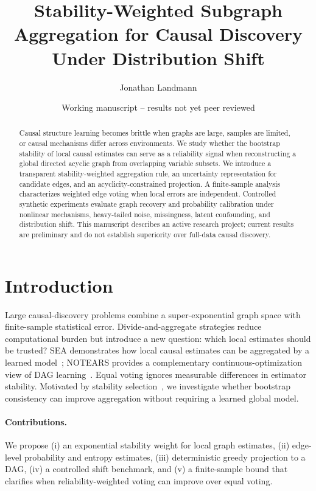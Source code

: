\documentclass[11pt]{article}
\title{Stability-Weighted Subgraph Aggregation for Causal Discovery Under Distribution Shift}
\author{Jonathan Landmann}
\date{Working manuscript -- results not yet peer reviewed}
\begin{document}
\maketitle

\begin{abstract}
Causal structure learning becomes brittle when graphs are large, samples are limited, or causal mechanisms differ across environments. We study whether the bootstrap stability of local causal estimates can serve as a reliability signal when reconstructing a global directed acyclic graph from overlapping variable subsets. We introduce a transparent stability-weighted aggregation rule, an uncertainty representation for candidate edges, and an acyclicity-constrained projection. A finite-sample analysis characterizes weighted edge voting when local errors are independent. Controlled synthetic experiments evaluate graph recovery and probability calibration under nonlinear mechanisms, heavy-tailed noise, missingness, latent confounding, and distribution shift. This manuscript describes an active research project; current results are preliminary and do not establish superiority over full-data causal discovery.
\end{abstract}

\section{Introduction}
Large causal-discovery problems combine a super-exponential graph space with finite-sample statistical error. Divide-and-aggregate strategies reduce computational burden but introduce a new question: which local estimates should be trusted? SEA demonstrates how local causal estimates can be aggregated by a learned model~\cite{wu2025sea}; NOTEARS provides a complementary continuous-optimization view of DAG learning~\cite{zheng2018notears}. Equal voting ignores measurable differences in estimator stability. Motivated by stability selection~\cite{meinshausen2010stability}, we investigate whether bootstrap consistency can improve aggregation without requiring a learned global model.

\paragraph{Contributions.}
We propose (i) an exponential stability weight for local graph estimates, (ii) edge-level probability and entropy estimates, (iii) deterministic greedy projection to a DAG, (iv) a controlled shift benchmark, and (v) a finite-sample bound that clarifies when reliability-weighted voting can improve over equal voting.
\end{document}

